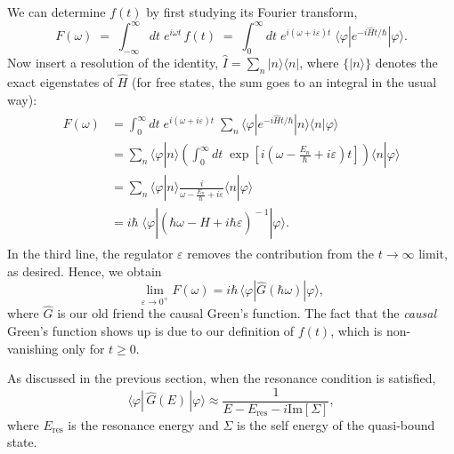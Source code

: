 \documentclass[pra,12pt]{revtex4}
\begin{document}
We can determine $f(t)$ by first studying its Fourier transform,
\begin{equation}
  F(\omega) \;=\; \int_{-\infty}^\infty dt \; e^{i\omega t}\, f(t) \;=\; \int_0^\infty dt \; e^{i(\omega + i\varepsilon) t} \; \langle\varphi|e^{-i\hat{H}t/\hbar}|\varphi\rangle.
\end{equation}
Now insert a resolution of the identity, $\hat{I} = \sum_n
|n\rangle\langle n|$, where $\{|n\rangle\}$ denotes the exact
eigenstates of $\hat{H}$ (for free states, the sum goes to an integral
in the usual way):
\begin{align}
  \begin{aligned}F(\omega) &= \int_0^\infty dt \; e^{i(\omega + i\varepsilon) t} \; \sum_n \langle\varphi|e^{-i\hat{H}t/\hbar}|n\rangle\langle n|\varphi\rangle \\ &= \sum_n \langle\varphi|n\rangle \left( \int_0^\infty dt \; \exp\left[i\left(\omega - \frac{E_n}{\hbar} + i\varepsilon\right) t\right] \right) \langle n|\varphi\rangle \\ &= \sum_n \langle\varphi|n\rangle \frac{i}{\omega - \frac{E_n}{\hbar} + i \varepsilon} \langle n|\varphi\rangle \\ &= i \hbar\; \langle \varphi | \left(\hbar\omega - \hat{H} + i\hbar\varepsilon \right)^{\!-1} | \varphi\rangle. \end{aligned}
\end{align}
In the third line, the regulator $\varepsilon$ removes the
contribution from the $t \rightarrow\infty$ limit, as desired.  Hence,
we obtain
\begin{equation}
  \lim_{\varepsilon \rightarrow 0^+} F(\omega) = i \hbar \, \langle \varphi | \hat{G}(\hbar\omega) | \varphi\rangle,
\end{equation}
where $\hat{G}$ is our old friend the causal Green's function.  The
fact that the \textit{causal} Green's function shows up is due to our
definition of $f(t)$, which is non-vanishing only for $t \ge 0$.

As discussed in the previous section, when the resonance condition is
satisfied,
\begin{equation}
  \langle\varphi|\,\hat{G}(E)\,|\varphi\rangle \approx \frac{1}{\displaystyle E - E_{\mathrm{res}} - i \mathrm{Im}[\Sigma]},
\end{equation}
where $E_{\mathrm{res}}$ is the resonance energy and $\Sigma$ is the
self energy of the quasi-bound state.
\end{document}

